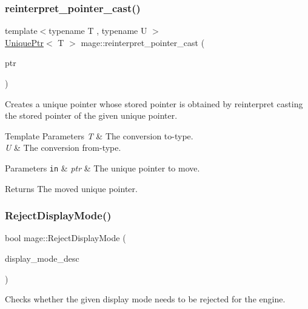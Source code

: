 \subsubsection{\texorpdfstring{reinterpret\+\_\+pointer\+\_\+cast()}{reinterpret\_pointer\_cast()}}
{\footnotesize\ttfamily template$<$typename T , typename U $>$ \\
\hyperlink{namespacemage_a8c307fbcc33bce9b7f2aa4c26c3b95cf}{Unique\+Ptr}$<$ T $>$ mage\+::reinterpret\+\_\+pointer\+\_\+cast (\begin{DoxyParamCaption}\item[{\hyperlink{namespacemage_a8c307fbcc33bce9b7f2aa4c26c3b95cf}{Unique\+Ptr}$<$ U $>$ \&\&}]{ptr }\end{DoxyParamCaption})}

Creates a unique pointer whose stored pointer is obtained by reinterpret casting the stored pointer of the given unique pointer.


\begin{DoxyTemplParams}{Template Parameters}
{\em T} & The conversion to-\/type. \\
\hline
{\em U} & The conversion from-\/type. \\
\hline
\end{DoxyTemplParams}

\begin{DoxyParams}[1]{Parameters}
\mbox{\tt in}  & {\em ptr} & The unique pointer to move. \\
\hline
\end{DoxyParams}
\begin{DoxyReturn}{Returns}
The moved unique pointer. 
\end{DoxyReturn}
\hypertarget{namespacemage_a1dc16500643280f4de21717837f5f27a}{}\label{namespacemage_a1dc16500643280f4de21717837f5f27a} 
\subsubsection{\texorpdfstring{Reject\+Display\+Mode()}{RejectDisplayMode()}}
{\footnotesize\ttfamily bool mage\+::\+Reject\+Display\+Mode (\begin{DoxyParamCaption}\item[{const D\+X\+G\+I\+\_\+\+M\+O\+D\+E\+\_\+\+D\+E\+S\+C1 \&}]{display\+\_\+mode\+\_\+desc }\end{DoxyParamCaption})}

Checks whether the given display mode needs to be rejected for the engine.


